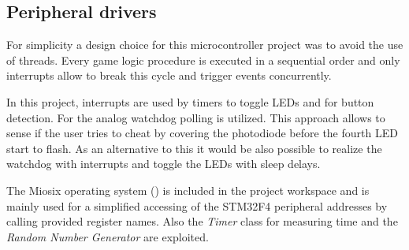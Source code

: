\subsection{Peripheral drivers}
For simplicity a design choice for this microcontroller project was to avoid the use of threads. Every game logic procedure is executed in a sequential order and only interrupts allow to break this cycle and trigger events concurrently.\\
\par
In this project, interrupts are used by timers to toggle LEDs and for button detection. For the analog watchdog polling is utilized.
This approach allows to sense if the user tries to cheat by covering the photodiode before the fourth LED start to flash. As an alternative to this it would be also possible to realize the watchdog with interrupts and toggle the LEDs with sleep delays.\\
\par
The Miosix operating system (\cite{Miosix}) is included in the project workspace and is mainly used for a simplified accessing of the STM32F4 peripheral addresses by calling provided register names. Also the \emph{Timer} class for measuring time and the \emph{Random Number Generator} are exploited.

